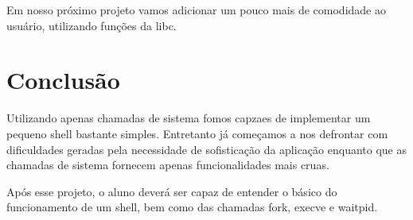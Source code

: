 Em nosso próximo projeto vamos adicionar um pouco mais de comodidade ao usuário, utilizando funções da libc.

\section{Conclusão}

Utilizando apenas chamadas de sistema fomos capzaes de implementar um pequeno shell bastante simples. Entretanto já começamos a nos defrontar com dificuldades geradas pela necessidade de sofisticação da aplicação enquanto que as chamadas de sistema fornecem apenas funcionalidades mais cruas.

Após esse projeto, o aluno deverá ser capaz de entender o básico do funcionamento de um shell, bem como das chamadas fork, execve e waitpid.